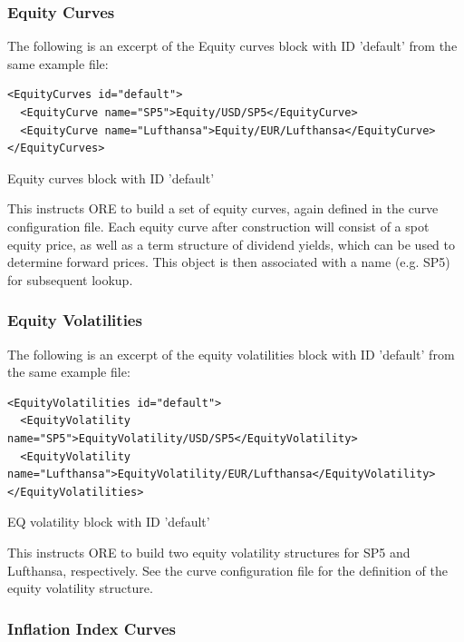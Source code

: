 \documentclass[12pt, a4paper]{article}
\begin{document}
{\subsubsection{Equity Curves}
The following is an excerpt of the Equity curves block with ID 'default' from the same example file:

\begin{listing}[H]
\begin{verbatim}
<EquityCurves id="default">
  <EquityCurve name="SP5">Equity/USD/SP5</EquityCurve>
  <EquityCurve name="Lufthansa">Equity/EUR/Lufthansa</EquityCurve>
</EquityCurves>
\end{verbatim}
\caption{Equity curves block with ID 'default'}
\label{lst:eqcurve_spec}
\end{listing}

This instructs ORE to build a set of equity curves, again defined in the curve configuration file. Each equity curve 
after construction will consist of a spot equity price, as well as a term structure of dividend yields, which can be 
used to determine forward prices. This object is then associated with a name (e.g. SP5) for subsequent lookup. 

\subsubsection{Equity Volatilities}

The following is an excerpt of the equity volatilities block with ID 'default' from the same example file:

\begin{listing}[H]
\begin{verbatim}
<EquityVolatilities id="default">
  <EquityVolatility name="SP5">EquityVolatility/USD/SP5</EquityVolatility>
  <EquityVolatility name="Lufthansa">EquityVolatility/EUR/Lufthansa</EquityVolatility>
</EquityVolatilities>
\end{verbatim}
\caption{EQ volatility block with ID 'default'}
\label{lst:eqvol_spec}
\end{listing}

This instructs ORE to build two equity volatility structures for SP5 and Lufthansa, respectively. See the curve
configuration file for the definition of the equity volatility structure.


\subsubsection{Inflation Index Curves}

}
\end{document}
